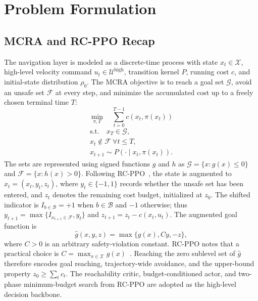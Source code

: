 \documentclass[conference]{IEEEtran}
\begin{document}
\section{Problem Formulation}
\label{sec:problem_setup}
\subsection{MCRA and RC-PPO Recap}
The navigation layer is modeled as a discrete-time process with state $x_t\in
\mathcal{X}$, high-level velocity command $u_t\in\mathcal{U}^{\mathrm{high}}$,
transition kernel $P$, running cost $c$, and initial-state distribution $\rho_0$.
The MCRA objective is to reach a goal set $\mathcal{G}$, avoid an unsafe set
$\mathcal{F}$ at every step, and minimize the accumulated cost up to a freely
chosen terminal time $T$:
\begin{equation}
\min_{\pi,T}\quad \sum_{t=0}^{T-1}c(x_t,\pi(x_t))
\label{eq:mcra_objective}
\end{equation}
\begin{equation}
\begin{gathered}
\mathrm{s.t.}\quad x_T\in\mathcal{G},\\
x_t\notin\mathcal{F}\ \forall t\leq T,\\
x_{t+1}\sim P(\cdot\mid x_t,\pi(x_t)).
\end{gathered}
\label{eq:mcra_constraints}
\end{equation}
The sets are represented using signed functions $g$ and $h$ as
$\mathcal{G}=\{x:g(x)\leq0\}$ and $\mathcal{F}=\{x:h(x)>0\}$. Following
RC-PPO~\cite{so2024}, the state is augmented to $\hat{x}_t=(x_t,y_t,z_t)$,
where $y_t\in\{-1,1\}$ records whether the unsafe set has been entered, and $z_t$
denotes the remaining cost budget, initialized at $z_0$. The shifted indicator is
$I_{b\in\mathcal{B}}=+1$ when $b\in\mathcal{B}$ and $-1$ otherwise; thus
$y_{t+1}=\max\{I_{x_{t+1}\in\mathcal{F}},y_t\}$ and
$z_{t+1}=z_t-c(x_t,u_t)$. The augmented goal function is
\begin{equation}
\hat{g}(x,y,z)=\max\{g(x),Cy,-z\},
\label{eq:augmented_goal}
\end{equation}
where $C>0$ is an arbitrary safety-violation constant. RC-PPO notes that a
practical choice is $C=\max_{x\in\mathcal{X}}g(x)$~\cite{so2024}. Reaching the
zero sublevel set of $\hat{g}$ therefore encodes goal reaching, trajectory-wide
avoidance, and the upper-bound property $z_0\geq\sum_t c_t$. The reachability critic,
budget-conditioned actor, and two-phase minimum-budget search from RC-PPO are
adopted as the high-level decision backbone.
\end{document}
